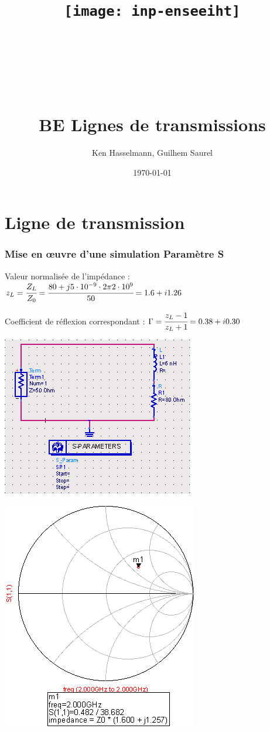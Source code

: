 \documentclass[10pt]{article}
\title{\texttt{[image: inp-enseeiht]} \\ ~ \\ ~ \\ ~ \\ ~ \\BE Lignes de transmissions}
\author{Ken Hasselmann, Guilhem Saurel}
\date{\today}
\begin{document}
 \begin{titlepage}
  \maketitle
  \tableofcontents
 \end{titlepage}

 \part{Ligne de transmission}
  \section{Mise en œuvre d’une simulation Paramètre S}
   Valeur normalisée de l’impédance : $z_L=\cfrac{Z_L}{Z_0}=\cfrac{80 + j 5 \cdot 10^{-9} \cdot 2 \pi 2 \cdot 10^9}{50} = 1.6+i1.26$

   Coefficient de réflexion correspondant : $\Gamma = \cfrac{z_L-1}{z_L+1}=0.38+i0.30$

   \includegraphics{I2_a_circuit.PNG}

   \includegraphics{I2_a_smith.PNG}
\end{document}
